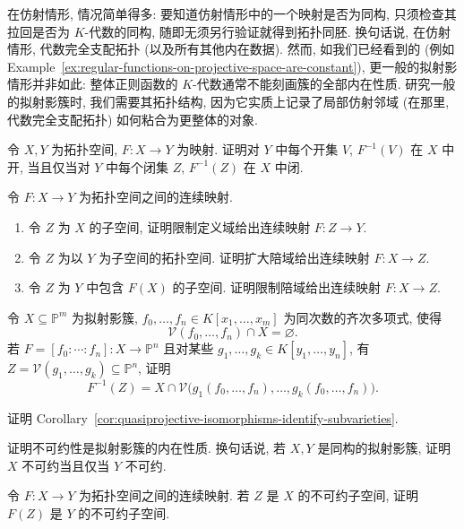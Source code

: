 在仿射情形, 情况简单得多: 要知道仿射情形中的一个映射是否为同构, 只须检查其拉回是否为 $K$-代数的同构, 随即无须另行验证就得到拓扑同胚. 换句话说, 在仿射情形, 代数完全支配拓扑 (以及所有其他内在数据). 然而, 如我们已经看到的 (例如 Example~\ref{ex:regular-functions-on-projective-space-are-constant}), 更一般的拟射影情形并非如此: 整体正则函数的 $K$-代数通常不能刻画簇的全部内在性质. 研究一般的拟射影簇时, 我们需要其拓扑结构, 因为它实质上记录了局部仿射邻域 (在那里, 代数完全支配拓扑) 如何粘合为更整体的对象.

\BookExerciseHeading
\begin{BookExercises}
  \item\label{ex:equivalent-open-and-closed-characterizations-of-continuity} 令 $X,Y$ 为拓扑空间, $F:X\to Y$ 为映射. 证明对 $Y$ 中每个开集 $V$, $F^{-1}(V)$ 在 $X$ 中开, 当且仅当对 $Y$ 中每个闭集 $Z$, $F^{-1}(Z)$ 在 $X$ 中闭.
  \item\label{ex:restrict-domain-or-change-codomain-of-continuous-map} 令 $F:X\to Y$ 为拓扑空间之间的连续映射.
  \begin{enumerate}
    \item 令 $Z$ 为 $X$ 的子空间, 证明限制定义域给出连续映射 $F:Z\to Y$.
    \item 令 $Z$ 为以 $Y$ 为子空间的拓扑空间. 证明扩大陪域给出连续映射 $F:X\to Z$.
    \item 令 $Z$ 为 $Y$ 中包含 $F(X)$ 的子空间. 证明限制陪域给出连续映射 $F:X\to Z$.
  \end{enumerate}
  \item\label{ex:preimage-of-projective-vanishing-set-under-polynomial-map} 令 $X\subseteq\mathbb{P}^{m}$ 为拟射影簇, $f_{0},\ldots,f_{n}\in K[x_{1},\ldots,x_{m}]$ 为同次数的齐次多项式, 使得
  \[
    \mathcal{V}(f_{0},\ldots,f_{n})\cap X=\varnothing.
  \]
  若 $F=[f_{0}:\cdots:f_{n}]:X\to\mathbb{P}^{n}$ 且对某些 $g_{1},\ldots,g_{k}\in K[y_{1},\ldots,y_{n}]$, 有 $Z=\mathcal{V}(g_{1},\ldots,g_{k})\subseteq\mathbb{P}^{n}$, 证明
  \[
    F^{-1}(Z)=X\cap\mathcal{V}\bigl(g_{1}(f_{0},\ldots,f_{n}),\ldots,g_{k}(f_{0},\ldots,f_{n})\bigr).
  \]
  \item\label{ex:isomorphisms-identify-open-closed-and-locally-closed-subsets} 证明 Corollary~\ref{cor:quasiprojective-isomorphisms-identify-subvarieties}.
  \item\label{ex:irreducibility-invariant-under-quasiprojective-isomorphism} 证明不可约性是拟射影簇的内在性质. 换句话说, 若 $X,Y$ 是同构的拟射影簇, 证明 $X$ 不可约当且仅当 $Y$ 不可约.
  \item\label{ex:continuous-image-of-irreducible-subspace-is-irreducible} 令 $F:X\to Y$ 为拓扑空间之间的连续映射. 若 $Z$ 是 $X$ 的不可约子空间, 证明 $F(Z)$ 是 $Y$ 的不可约子空间.

\end{BookExercises}
